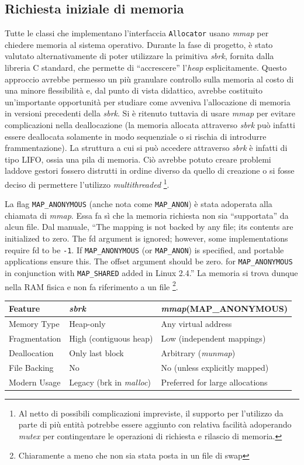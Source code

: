 \subsection{Richiesta iniziale di memoria}
Tutte le classi che implementano l’interfaccia \texttt{Allocator} usano \textit{mmap} per chiedere memoria al sistema operativo. Durante la fase di progetto, è stato valutato alternativamente di poter utilizzare la primitiva \textit{sbrk}, fornita dalla libreria C standard, che permette di “accrescere” l’\textit{heap} esplicitamente. Questo approccio avrebbe permesso un più granulare controllo sulla memoria al costo di una minore flessibilità e, dal punto di vista didattico, avrebbe costituito un'importante opportunità per studiare come avveniva l’allocazione di memoria in versioni precedenti della \textit{sbrk}.
Si è ritenuto tuttavia di usare \textit{mmap} per evitare complicazioni nella deallocazione (la memoria allocata attraverso \textit{sbrk} può infatti essere deallocata solamente in modo sequenziale o si rischia di introdurre frammentazione). La struttura a cui si può accedere attraverso \textit{sbrk} è infatti di tipo LIFO, ossia una pila di memoria. Ciò avrebbe potuto creare problemi laddove gestori fossero distrutti in ordine diverso da quello di creazione o si fosse deciso di permettere l’utilizzo \textit{multithreaded} \footnote{Al netto di possibili complicazioni impreviste, il supporto per l'utilizzo da parte di più entità potrebbe essere aggiunto con relativa facilità adoperando \textit{mutex} per contingentare le operazioni di richiesta e rilascio di memoria.}.

La flag \texttt{MAP\_ANONYMOUS} (anche nota come \texttt{MAP\_ANON}) è stata adoperata alla chiamata di \textit{mmap}. Essa fa sì che la memoria richiesta non sia “supportata” da alcun file. Dal manuale, “The mapping is not backed by any file; its contents are initialized to zero. The fd argument is ignored; however, some implementations require fd to be \texttt{-1}. If \texttt{MAP\_ANONYMOUS} (or \texttt{MAP\_ANON}) is specified, and portable applications ensure this. The offset argument should be zero. for \texttt{MAP\_ANONYMOUS} in conjunction with \texttt{MAP\_SHARED} added in Linux 2.4.” La memoria si trova dunque nella RAM fisica e non fa riferimento a un file \footnote{Chiaramente a meno che non sia stata posta in un file di swap}.

\begin{center}
\begin{tabular}{|l|l|l|}
\hline
Feature & \textit{sbrk} & \textit{mmap}(MAP\_ANONYMOUS) \\
\hline
Memory Type & Heap-only & Any virtual address \\
Fragmentation & High (contiguous heap) & Low (independent mappings) \\
Deallocation & Only last block & Arbitrary (\textit{munmap}) \\
File Backing & No & No (unless explicitly mapped) \\
Modern Usage & Legacy (brk in \textit{malloc}) & Preferred for large allocations \\
\hline
\end{tabular}
\end{center}

